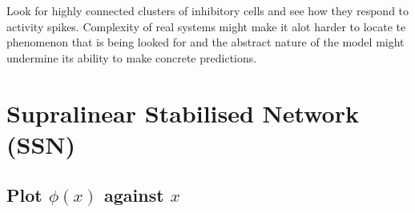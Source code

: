 \documentclass[11pt]{article}
\begin{document}
    Look for highly connected clusters of inhibitory cells and see how they
respond to activity spikes. Complexity of real systems might make it
alot harder to locate te phenomenon that is being looked for and the
abstract nature of the model might undermine its ability to make
concrete predictions.

    \hypertarget{supralinear-stabilised-network-ssn}{%
\section{Supralinear Stabilised Network
(SSN)}\label{supralinear-stabilised-network-ssn}}

    \hypertarget{plot-phix-against-x}{%
\subsection{\texorpdfstring{Plot \(\phi(x)\) against
\(x\)}{Plot \textbackslash phi(x) against x}}\label{plot-phix-against-x}}
\end{document}
